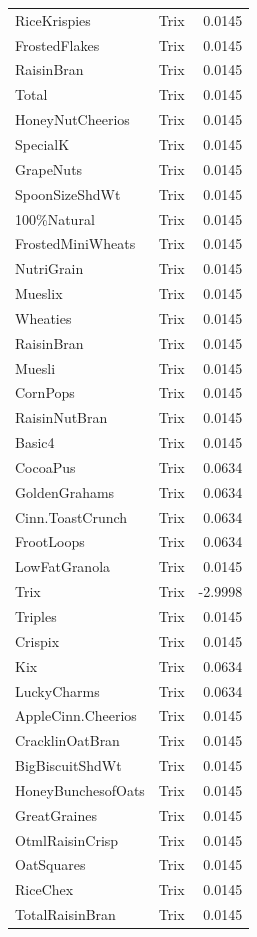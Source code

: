 \begin{longtable}{llr}
RiceKrispies & Trix & 0.0145 \\
FrostedFlakes & Trix & 0.0145 \\
RaisinBran & Trix & 0.0145 \\
Total & Trix & 0.0145 \\
HoneyNutCheerios & Trix & 0.0145 \\
SpecialK & Trix & 0.0145 \\
GrapeNuts & Trix & 0.0145 \\
SpoonSizeShdWt & Trix & 0.0145 \\
100\%Natural & Trix & 0.0145 \\
FrostedMiniWheats & Trix & 0.0145 \\
NutriGrain & Trix & 0.0145 \\
Mueslix & Trix & 0.0145 \\
Wheaties & Trix & 0.0145 \\
RaisinBran & Trix & 0.0145 \\
Muesli & Trix & 0.0145 \\
CornPops & Trix & 0.0145 \\
RaisinNutBran & Trix & 0.0145 \\
Basic4 & Trix & 0.0145 \\
CocoaPus & Trix & 0.0634 \\
GoldenGrahams & Trix & 0.0634 \\
Cinn.ToastCrunch & Trix & 0.0634 \\
FrootLoops & Trix & 0.0634 \\
LowFatGranola & Trix & 0.0145 \\
Trix & Trix & -2.9998 \\
Triples & Trix & 0.0145 \\
Crispix & Trix & 0.0145 \\
Kix & Trix & 0.0634 \\
LuckyCharms & Trix & 0.0634 \\
AppleCinn.Cheerios & Trix & 0.0145 \\
CracklinOatBran & Trix & 0.0145 \\
BigBiscuitShdWt & Trix & 0.0145 \\
HoneyBunchesofOats & Trix & 0.0145 \\
GreatGraines & Trix & 0.0145 \\
OtmlRaisinCrisp & Trix & 0.0145 \\
OatSquares & Trix & 0.0145 \\
RiceChex & Trix & 0.0145 \\
TotalRaisinBran & Trix & 0.0145 \\

\end{longtable}
